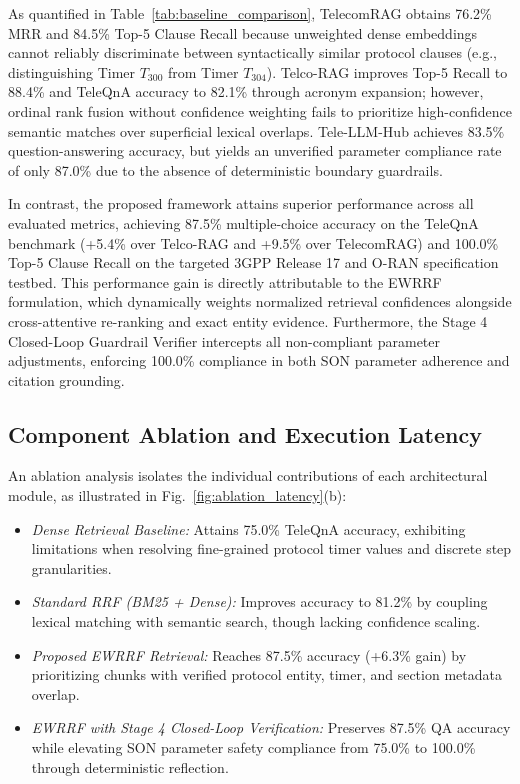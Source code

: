 \documentclass[conference]{IEEEtran}
\begin{document}
As quantified in Table~\ref{tab:baseline_comparison}, TelecomRAG obtains 76.2\% MRR and 84.5\% Top-5 Clause Recall because unweighted dense embeddings cannot reliably discriminate between syntactically similar protocol clauses (e.g., distinguishing Timer $T_{300}$ from Timer $T_{304}$). Telco-RAG improves Top-5 Recall to 88.4\% and TeleQnA accuracy to 82.1\% through acronym expansion; however, ordinal rank fusion without confidence weighting fails to prioritize high-confidence semantic matches over superficial lexical overlaps. Tele-LLM-Hub achieves 83.5\% question-answering accuracy, but yields an unverified parameter compliance rate of only 87.0\% due to the absence of deterministic boundary guardrails.

In contrast, the proposed framework attains superior performance across all evaluated metrics, achieving 87.5\% multiple-choice accuracy on the TeleQnA benchmark (+5.4\% over Telco-RAG and +9.5\% over TelecomRAG) and 100.0\% Top-5 Clause Recall on the targeted 3GPP Release 17 and O-RAN specification testbed. This performance gain is directly attributable to the EWRRF formulation, which dynamically weights normalized retrieval confidences alongside cross-attentive re-ranking and exact entity evidence. Furthermore, the Stage 4 Closed-Loop Guardrail Verifier intercepts all non-compliant parameter adjustments, enforcing 100.0\% compliance in both SON parameter adherence and citation grounding.

\subsection{Component Ablation and Execution Latency}
An ablation analysis isolates the individual contributions of each architectural module, as illustrated in Fig.~\ref{fig:ablation_latency}(b):
\begin{itemize}
    \item \textit{Dense Retrieval Baseline:} Attains 75.0\% TeleQnA accuracy, exhibiting limitations when resolving fine-grained protocol timer values and discrete step granularities.
    \item \textit{Standard RRF (BM25 + Dense):} Improves accuracy to 81.2\% by coupling lexical matching with semantic search, though lacking confidence scaling.
    \item \textit{Proposed EWRRF Retrieval:} Reaches 87.5\% accuracy (+6.3\% gain) by prioritizing chunks with verified protocol entity, timer, and section metadata overlap.
    \item \textit{EWRRF with Stage 4 Closed-Loop Verification:} Preserves 87.5\% QA accuracy while elevating SON parameter safety compliance from 75.0\% to 100.0\% through deterministic reflection.
\end{itemize}
\end{document}
